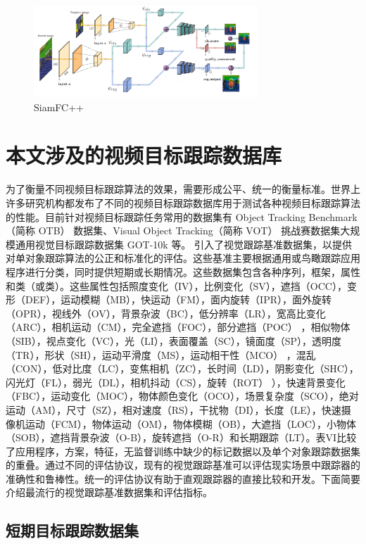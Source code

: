 \begin{figure}
\centering
\includegraphics[width=0.75\textwidth]{Img/related/SiamFC++.png}
\caption{SiamFC++}
\end{figure}
\fi
\section{本文涉及的视频目标跟踪数据库}
为了衡量不同视频目标跟踪算法的效果，需要形成公平、统一的衡量标准。世界上许多研究机构都发布了不同的视频目标跟踪数据库用于测试各种视频目标跟踪算法的性能。目前针对视频目标跟踪任务常用的数据集有 Object Tracking Benchmark（简称 OTB）\cite{OTB} 数据集、Visual Object Tracking（简称 VOT）\cite{VOT} 挑战赛数据集大规模通用视觉目标跟踪数据集 GOT-10k \cite{GOT-10k} 等。
引入了视觉跟踪基准数据集，以提供对单对象跟踪算法的公正和标准化的评估。这些基准主要根据通用或鸟瞰跟踪应用程序进行分类，同时提供短期或长期情况。这些数据集包含各种序列，框架，属性和类（或类）。这些属性包括照度变化（IV），比例变化（SV），遮挡（OCC），变形（DEF），运动模糊（MB），快运动（FM），面内旋转（IPR），面外旋转（OPR），视线外（OV），背景杂波（BC），低分辨率（LR），宽高比变化（ARC），相机运动（CM），完全遮挡（FOC），部分遮挡（POC） ，相似物体（SIB），视点变化（VC），光（LI），表面覆盖（SC），镜面度（SP），透明度（TR），形状（SH），运动平滑度（MS），运动相干性（MCO） ，混乱（CON），低对比度（LC），变焦相机（ZC），长时间（LD），阴影变化（SHC），闪光灯（FL），弱光（DL），相机抖动（CS），旋转（ROT） ），快速背景变化（FBC），运动变化（MOC），物体颜色变化（OCO），场景复杂度（SCO），绝对运动（AM），尺寸（SZ），相对速度（RS），干扰物（DI），长度（LE），快速摄像机运动（FCM），物体运动（OM），物体模糊（OB），大遮挡（LOC），小物体（SOB），遮挡背景杂波（O-B），旋转遮挡（O-R）和长期跟踪（LT）。表VI比较了应用程序，方案，特征，无监督训练中缺少的标记数据以及单个对象跟踪数据集的重叠。通过不同的评估协议，现有的视觉跟踪基准可以评估现实场景中跟踪器的准确性和鲁棒性。统一的评估协议有助于直观跟踪器的直接比较和开发。下面简要介绍最流行的视觉跟踪基准数据集和评估指标。
\subsection{短期目标跟踪数据集}
